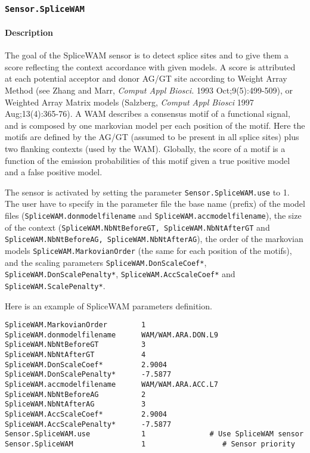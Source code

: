 
\subsubsection{\texttt{Sensor.SpliceWAM}}

\paragraph{Description}

The goal of the SpliceWAM sensor is to detect splice sites and to
give them a score reflecting the context accordance with given
models. A score is attributed at each potential acceptor and donor
AG/GT site according to Weight Array Method (see Zhang and Marr, {\em
Comput Appl Biosci.} 1993 Oct;9(5):499-509), or Weighted Array Matrix
models (Salzberg, {\em Comput Appl Biosci} 1997 Aug;13(4):365-76). A
WAM describes a consensus motif of a functional signal, and is
composed by one markovian model per each position of the motif. Here
the motifs are defined by the AG/GT (assumed to be present in all
splice sites) plus two flanking contexts (used by the WAM).  Globally,
the score of a motif is a function of the emission probabilities of
this motif given a true positive model and a false positive model.

The sensor is activated by setting the parameter
\texttt{Sensor.SpliceWAM.use} to 1.  The user have to specify in
the parameter file the base name (prefix) of the model files
(\texttt{SpliceWAM.donmodelfilename} and
\texttt{SpliceWAM.accmodelfilename}), the size of the context
(\texttt{SpliceWAM.NbNtBeforeGT, SpliceWAM.NbNtAfterGT} and
\texttt{SpliceWAM.NbNtBeforeAG, SpliceWAM.NbNtAfterAG}), the order of
the markovian models \texttt{SpliceWAM.MarkovianOrder} (the same for
each position of the motifs), and the scaling parameters
\texttt{SpliceWAM.DonScaleCoef*}, \texttt{SpliceWAM.DonScalePenalty*},
\texttt{SpliceWAM.AccScaleCoef*} and \texttt{SpliceWAM.ScalePenalty*}.

Here is an example of SpliceWAM parameters definition.
\begin{Verbatim}[fontsize=\small]
SpliceWAM.MarkovianOrder        1
SpliceWAM.donmodelfilename      WAM/WAM.ARA.DON.L9
SpliceWAM.NbNtBeforeGT          3
SpliceWAM.NbNtAfterGT           4
SpliceWAM.DonScaleCoef*         2.9004
SpliceWAM.DonScalePenalty*      -7.5877
SpliceWAM.accmodelfilename      WAM/WAM.ARA.ACC.L7
SpliceWAM.NbNtBeforeAG          2
SpliceWAM.NbNtAfterAG           3
SpliceWAM.AccScaleCoef*         2.9004
SpliceWAM.AccScalePenalty*      -7.5877
Sensor.SpliceWAM.use            1               # Use SpliceWAM sensor
Sensor.SpliceWAM                1                  # Sensor priority
\end{Verbatim}

